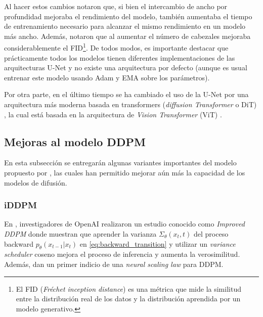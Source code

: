 
Al hacer estos cambios notaron que, si bien el intercambio de ancho por profundidad mejoraba el rendimiento del modelo, también aumentaba el tiempo de entrenamiento necesario para alcanzar el mismo rendimiento en un modelo más ancho. Además, notaron que al aumentar el número de cabezales mejoraba considerablemente el FID\footnote{El FID (\textit{Fréchet inception distance}) es una métrica que mide la similitud entre la distribución real de los datos y la distribución aprendida por un modelo generativo.}. De todos modos, es importante destacar que prácticamente todos los modelos tienen diferentes implementaciones de las arquitecturas U-Net y no existe una arquitectura por defecto (aunque es usual entrenar este modelo usando Adam y EMA sobre los parámetros).

Por otra parte, en el último tiempo se ha cambiado el uso de la U-Net por una arquitectura más moderna basada en transformers (\textit{diffusion Transformer} o DiT) \cite{peebles2023scalablediffusionmodelstransformers}, la cual está basada en la arquitectura de \textit{Vision Transformer} (ViT) \cite{dosovitskiy2021image}.

\subsection{Mejoras al modelo DDPM}
\label{dm/discrete_dm/improvements}

En esta subsección se entregarán algunas variantes importantes del modelo propuesto por \cite{ho2020denoising}, las cuales han permitido mejorar aún más la capacidad de los modelos de difusión.

\subsubsection{iDDPM}

En \cite{nichol2021improved}, investigadores de OpenAI realizaron un estudio conocido como \textit{Improved DDPM} donde muestran que aprender la varianza $\Sigma_\theta(x_t,t)$ del proceso backward $p_\theta(x_{t-1}|x_t)$ en \eqref{eq:backward_transition} y utilizar un \textit{variance scheduler} coseno mejora el proceso de inferencia y aumenta la verosimilitud. Además, dan un primer indicio de una \textit{neural scaling law} para DDPM.

